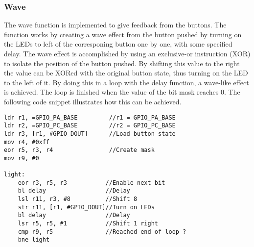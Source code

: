 \subsubsection{Wave}
The wave function is implemented to give feedback from the buttons. The function works by creating a wave effect from the button pushed by turning on the LEDs to left of the corresponing button one by one, with some specified delay. The wave effect is accomplished by using an exclusive-or instruction (XOR) to isolate the position of the button pushed. By shifting this value to the right the value can be XORed with the original button state, thus turning on the LED to the left of it. By doing this in a loop with the delay function, a wave-like effect is achieved. The loop is finished when the value of the bit mask reaches 0. The following code snippet illustrates how this can be achieved. 

\begin{lstlisting}
ldr r1, =GPIO_PA_BASE         //r1 = GPIO_PA_BASE
ldr r2, =GPIO_PC_BASE         //r2 = GPIO_PC_BASE
ldr r3, [r1, #GPIO_DOUT]      //Load button state
mov r4, #0xff               
eor r5, r3, r4                //Create mask 
mov r9, #0

light:
    eor r3, r5, r3           //Enable next bit  
    bl delay                 //Delay
    lsl r11, r3, #8          //Shift 8   
    str r11, [r1, #GPIO_DOUT]//Turn on LEDs 
    bl delay                 //Delay
    lsr r5, r5, #1           //Shift 1 right 
    cmp r9, r5               //Reached end of loop ? 
    bne light
\end{lstlisting}
